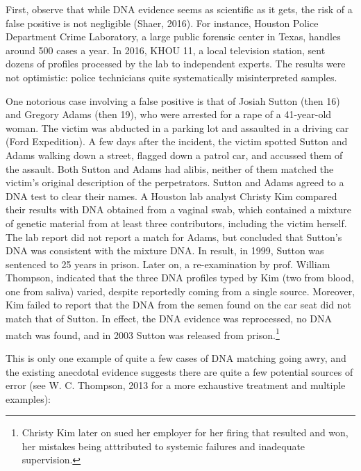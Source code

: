 \documentclass[
  10pt,
  dvipsnames,enabledeprecatedfontcommands]{scrartcl}
\begin{document}
First, observe that while DNA evidence seems as scientific as it gets,
the risk of a false positive is not negligible (Shaer, 2016). For
instance, Houston Police Department Crime Laboratory, a large public
forensic center in Texas, handles around 500 cases a year. In 2016, KHOU
11, a local television station, sent dozens of profiles processed by the
lab to independent experts. The results were not optimistic: police
technicians quite systematically misinterpreted samples.

One notorious case involving a false positive is that of Josiah Sutton
(then 16) and Gregory Adams (then 19), who were arrested for a rape of a
41-year-old woman. The victim was abducted in a parking lot and
assaulted in a driving car (Ford Expedition). A few days after the
incident, the victim spotted Sutton and Adams walking down a street,
flagged down a patrol car, and accussed them of the assault. Both Sutton
and Adams had alibis, neither of them matched the victim's original
description of the perpetrators. Sutton and Adams agreed to a DNA test
to clear their names. A Houston lab analyst Christy Kim compared their
results with DNA obtained from a vaginal swab, which contained a mixture
of genetic material from at least three contributors, including the
victim herself. The lab report did not report a match for Adams, but
concluded that Sutton's DNA was consistent with the mixture DNA. In
result, in 1999, Sutton was sentenced to 25 years in prison. Later on, a
re-examination by prof. William Thompson, indicated that the three DNA
profiles typed by Kim (two from blood, one from saliva) varied, despite
reportedly coming from a single source. Moreover, Kim failed to report
that the DNA from the semen found on the car seat did not match that of
Sutton. In effect, the DNA evidence was reprocessed, no DNA match was
found, and in 2003 Sutton was released from prison.\footnote{Christy Kim
  later on sued her employer for her firing that resulted and won, her
  mistakes being atttributed to systemic failures and inadequate
  supervision.}

This is only one example of quite a few cases of DNA matching going
awry, and the existing anecdotal evidence suggests there are quite a few
potential sources of error (see W. C. Thompson, 2013 for a more
exhaustive treatment and multiple examples):
\end{document}
